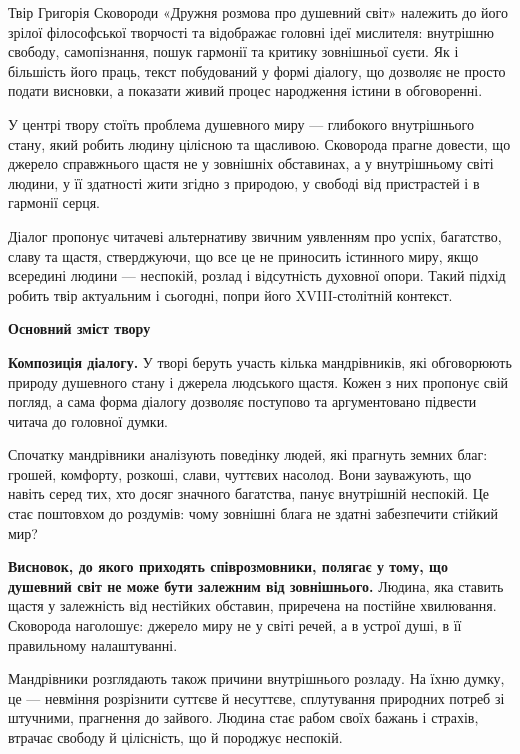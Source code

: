 \documentclass[12pt,a4paper]{article}
\begin{document}
Твір Григорія Сковороди «Дружня розмова про душевний світ» належить до його зрілої філософської творчості та відображає головні ідеї мислителя: внутрішню свободу, самопізнання, пошук гармонії та критику зовнішньої суєти. Як і більшість його праць, текст побудований у формі діалогу, що дозволяє не просто подати висновки, а показати живий процес народження істини в обговоренні.

У центрі твору стоїть проблема душевного миру — глибокого внутрішнього стану, який робить людину цілісною та щасливою. Сковорода прагне довести, що джерело справжнього щастя не у зовнішніх обставинах, а у внутрішньому світі людини, у її здатності жити згідно з природою, у свободі від пристрастей і в гармонії серця.

Діалог пропонує читачеві альтернативу звичним уявленням про успіх, багатство, славу та щастя, стверджуючи, що все це не приносить істинного миру, якщо всередині людини — неспокій, розлад і відсутність духовної опори. Такий підхід робить твір актуальним і сьогодні, попри його XVIII-столітній контекст.

\vspace{1em}

\begin{center}\textbf{\large Основний зміст твору}\end{center}

\textbf{Композиція діалогу.}  
У творі беруть участь кілька мандрівників, які обговорюють природу душевного стану і джерела людського щастя. Кожен з них пропонує свій погляд, а сама форма діалогу дозволяє поступово та аргументовано підвести читача до головної думки.

Спочатку мандрівники аналізують поведінку людей, які прагнуть земних благ: грошей, комфорту, розкоші, слави, чуттєвих насолод. Вони зауважують, що навіть серед тих, хто досяг значного багатства, панує внутрішній неспокій. Це стає поштовхом до роздумів: чому зовнішні блага не здатні забезпечити стійкий мир?

\textbf{Висновок, до якого приходять співрозмовники, полягає у тому, що душевний світ не може бути залежним від зовнішнього.}  
Людина, яка ставить щастя у залежність від нестійких обставин, приречена на постійне хвилювання. Сковорода наголошує: джерело миру не у світі речей, а в устрої душі, в її правильному налаштуванні.

Мандрівники розглядають також причини внутрішнього розладу. На їхню думку, це --- невміння розрізнити суттєве й несуттєве, сплутування природних потреб зі штучними, прагнення до зайвого. Людина стає рабом своїх бажань і страхів, втрачає свободу й цілісність, що й породжує неспокій.
\end{document}
